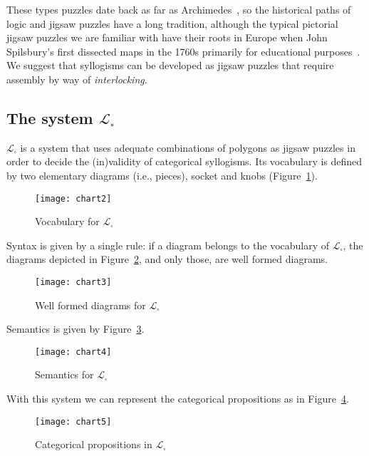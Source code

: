 \documentclass[a4paper,UKenglish]{lipics}
\begin{document}
These types puzzles date back as far as Archimedes~\cite{SLOCUM}, so the historical paths of logic and jigsaw puzzles have a long tradition, although the typical pictorial jigsaw puzzles we are familiar with have their roots in Europe when John Spilsbury's first dissected maps in the 1760s primarily for educational purposes~\cite{WILLIAMS}. We suggest that syllogisms can be developed as jigsaw puzzles that require assembly by way of \textit{interlocking}.

\pagebreak

\subsection{The system $\mathcal{L}_{\square}$}
$\mathcal{L}_{\square}$ is a system that uses adequate combinations of polygons as jigsaw puzzles in order to decide the (in)validity of categorical syllogisms. Its vocabulary is defined by two elementary diagrams (i.e., pieces), socket and knobs (Figure~\ref{fig:1}). 
 
\begin{figure}[h]
  \texttt{[image: chart2]}
  \caption{Vocabulary for $\mathcal{L}_{\square}$}
  \label{fig:1}
\end{figure}

Syntax is given by a single rule: if a diagram belongs to the vocabulary of $\mathcal{L}_{\square}$, the diagrams depicted in Figure~\ref{fig:2}, and only those, are well formed diagrams. 

\begin{figure}[h]
  \texttt{[image: chart3]}
  \caption{Well formed diagrams for $\mathcal{L}_{\square}$}
  \label{fig:2}
\end{figure}

Semantics is given by Figure~\ref{fig:3}. 

\begin{figure}[h]
  \texttt{[image: chart4]}
  \caption{Semantics for $\mathcal{L}_{\square}$}
  \label{fig:3}
\end{figure}

\pagebreak

With this system we can represent the categorical propositions as in Figure~\ref{fig:4}. 

\begin{figure}[h]
  \texttt{[image: chart5]}
  \caption{Categorical propositions in $\mathcal{L}_{\square}$}
  \label{fig:4}
\end{figure}
\end{document}
